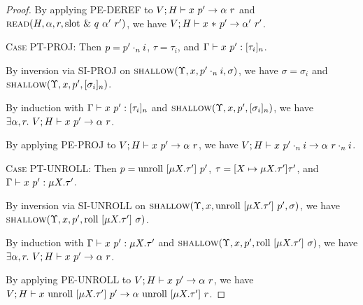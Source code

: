 \documentclass{article}
\begin{document}
\begin{proof}
    By applying \textsc{PE-DEREF} to ${{V};{H}} \vdash {{x}\ {p'}} \rightarrow {{\alpha}\ {r}}$ and
    $\textsc{read}({H},{\alpha},{r},{\textrm{slot}\ {\&\ {q}\ {\alpha'}\ {r'}}})$, we have
    ${{V};{H}} \vdash {{x}\ {*\ {p'}}} \rightarrow {{\alpha'}\ {r'}}$.

  \textsc{Case PT-PROJ}:
    Then $p = {p'}\cdot_{n} {i}$, $\tau = \tau_i$, and ${{\Gamma}} \vdash {{x}\ {p'}} : {{[ {\tau_i} ]_{n}}}$.

    By inversion via \textsc{SI-PROJ} on $\textsc{shallow}({\Upsilon},{x},{{p'}\cdot_{n} {i}},{\sigma})$,
    we have $\sigma = \sigma_i$ and $\textsc{shallow}({\Upsilon},{x},{p'},{[ {\sigma_i} ]_{n}})$.

    By induction with ${{\Gamma}} \vdash {{x}\ {p'}} : {{[ {\tau_i} ]_{n}}}$
    and $\textsc{shallow}({\Upsilon},{x},{p'},{[ {\sigma_i} ]_{n}})$,
    we have $\exists \alpha, r.\ \PEval{V}{H}{x}{p'}{\alpha}{r}$.

    By applying \textsc{PE-PROJ} to ${{V};{H}} \vdash {{x}\ {p'}} \rightarrow {{\alpha}\ {r}}$,
    we have ${{V};{H}} \vdash {{x}\ {{p'}\cdot_{n} {i}}} \rightarrow {{\alpha}\ {{r}\cdot_{n} {i}}}$.

  \textsc{Case PT-UNROLL}:
    Then $p = \textrm{unroll}\ [{\mu {X}.{\tau'}}]\ {p'}$, $\tau = [{X} \mapsto {\mu {X}.{\tau'}}]{\tau'}$,
    and ${{\Gamma}} \vdash {{x}\ {p'}} : {{\mu {X}.{\tau'}}}$.

    By inversion via \textsc{SI-UNROLL} on
    $\textsc{shallow}({\Upsilon},{x},{\textrm{unroll}\ [{\mu {X}.{\tau'}}]\ {p'}},{\sigma})$, we have
    $\textsc{shallow}({\Upsilon},{x},{p'},{\textrm{roll}\ [{\mu {X}.{\tau'}}]\ {\sigma}})$.

    By induction with ${{\Gamma}} \vdash {{x}\ {p'}} : {{\mu {X}.{\tau'}}}$
    and $\textsc{shallow}({\Upsilon},{x},{p'},{\textrm{roll}\ [{\mu {X}.{\tau'}}]\ {\sigma}})$,
    we have $\exists \alpha, r.\ \PEval{V}{H}{x}{p'}{\alpha}{r}$.

    By applying \textsc{PE-UNROLL} to ${{V};{H}} \vdash {{x}\ {p'}} \rightarrow {{\alpha}\ {r}}$,
    we have ${{V};{H}} \vdash {{x}\ {\textrm{unroll}\ [{\mu {X}.{\tau'}}]\ {p'}}} \rightarrow {{\alpha}\ {\textrm{unroll}\ [{\mu {X}.{\tau'}}]\ {r}}}$.
\end{proof}
\end{document}
